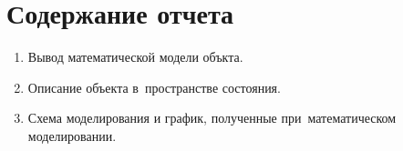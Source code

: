 \documentclass[12pt,a4paper,openany]{extarticle}
\begin{document}
\section{Содержание отчета}
\begin{enumerate}
	\item Вывод математической модели объкта.
	\item Описание объекта в~пространстве состояния.
	\item Схема моделирования и график, полученные при~математическом моделировании.
\end{enumerate}
\end{document}
